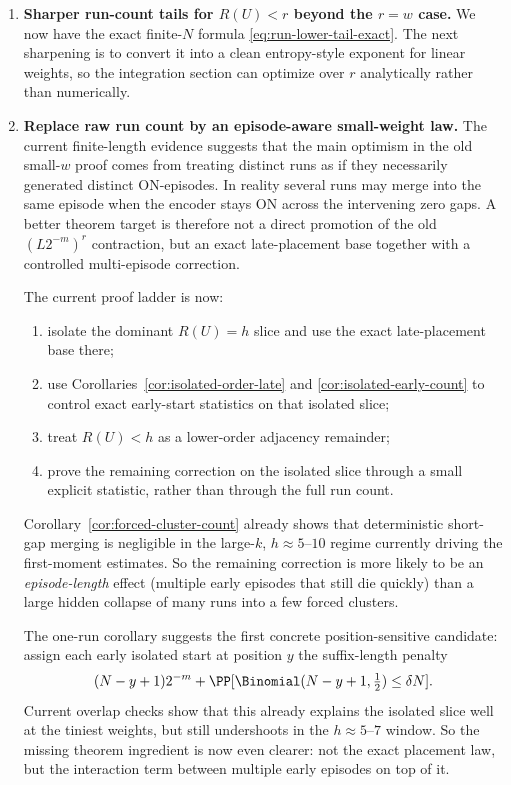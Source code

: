 \begin{enumerate}
\item \textbf{Sharper run-count tails for $R(U)<r$ beyond the $r=w$ case.}
We now have the exact finite-$N$ formula \eqref{eq:run-lower-tail-exact}. The next sharpening is to convert it into a
clean entropy-style exponent for linear weights, so the integration section can optimize over $r$ analytically rather
than numerically.

\item \textbf{Replace raw run count by an episode-aware small-weight law.}
The current finite-length evidence suggests that the main optimism in the old small-$w$ proof comes from treating
distinct runs as if they necessarily generated distinct ON-episodes. In reality several runs may merge into the same
episode when the encoder stays ON across the intervening zero gaps. A better theorem target is therefore not a direct
promotion of the old $(L2^{-m})^r$ contraction, but an exact late-placement base together with a controlled
multi-episode correction.

The current proof ladder is now:
\begin{enumerate}
\item isolate the dominant \(R(U)=h\) slice and use the exact late-placement base there;
\item use Corollaries~\ref{cor:isolated-order-late} and \ref{cor:isolated-early-count} to control exact early-start
statistics on that isolated slice;
\item treat \(R(U)<h\) as a lower-order adjacency remainder;
\item prove the remaining correction on the isolated slice through a small explicit statistic, rather than through the
full run count.
\end{enumerate}

Corollary~\ref{cor:forced-cluster-count} already shows that deterministic short-gap merging is negligible in the
large-$k$, \(h\approx 5\text{--}10\) regime currently driving the first-moment estimates. So the remaining correction
is more likely to be an \emph{episode-length} effect (multiple early episodes that still die quickly) than a large
hidden collapse of many runs into a few forced clusters.

The one-run corollary suggests the first concrete position-sensitive candidate:
assign each early isolated start at position \(y\) the suffix-length penalty
\[
(N-y+1)2^{-m} + \PP[\Binomial(N-y+1,\tfrac12)\le \delta N].
\]
Current overlap checks show that this already explains the isolated slice well at the tiniest weights, but still
undershoots in the \(h\approx 5\text{--}7\) window. So the missing theorem ingredient is now even clearer:
not the exact placement law, but the interaction term between multiple early episodes on top of it.


\end{enumerate}
